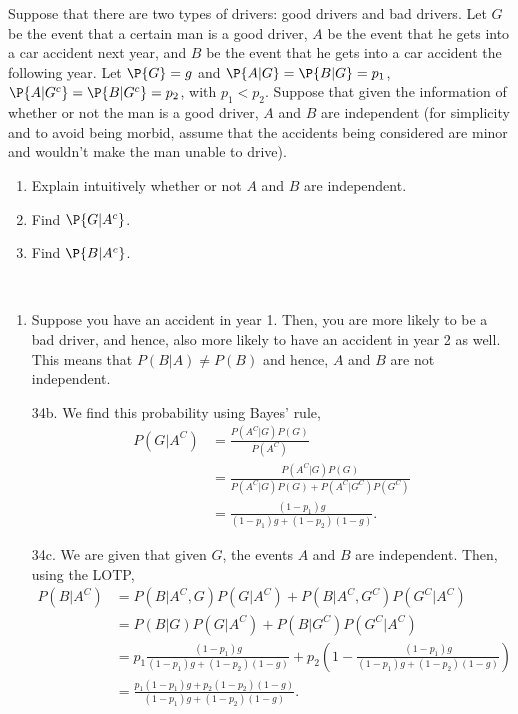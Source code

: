 

\setcounter{theorem}{15}

\begin{exercise} [BH.2.16] 
Suppose that there are two types of drivers: good drivers and bad drivers. Let $G$ be the event that a certain man is a good driver, $A$ be the event that he gets into a car accident next year, and $B$ be the event that he gets into a car accident the following year. Let $\P{G} = g$ and $\P{A|G} = \P{B|G} = p_1$, $\P{A|G^c} = \P{B|G^c} = p_2$, with $p_1 < p_2$. Suppose that given the information of whether or not the man is a good driver, $A$ and $B$ are independent (for simplicity and to avoid being morbid, assume that the accidents being considered are minor and wouldn’t make the man unable to drive).
	\begin{enumerate}
		\item Explain intuitively whether or not $A$ and $B$ are independent.
		\item Find $\P{G|A^c}$.
		\item Find $\P{B|A^c}$.
	\end{enumerate}
\begin{solution}~
	\begin{enumerate}
		\item Suppose you have an accident in year 1. Then, you are more likely to be a bad driver, and hence, also more likely to have an accident in year 2 as well. This means that $P(B|A)\neq P(B)$ and hence, $A$ and $B$ are not independent.
		\item[34b.] We find this probability using Bayes' rule,
		\begin{align*}
			P(G|A^{C})& =\frac{P(A^{C}|G)P(G)}{P(A^{C})}\\ &=\frac{P(A^{C}|G)P(G)}{P(A^{C}|G)P(G) + P(A^{C}|G^C)P(G^C)}\\
			&= \frac{(1-p_{1})g}{(1-p_{1})g + (1-p_{2})(1-g)}.
		\end{align*}
		\item[34c.] We are given that given $G$, the events $A$ and $B$ are independent. Then, using the LOTP,
 		\begin{align*}
			P(B|A^{C})& = P(B|A^{C},G)P(G|A^{C}) + P(B|A^{C},G^{C})P(G^{C}|A^{C})\\
			&=P(B|G)P(G|A^{C}) + P(B|G^{C})P(G^{C}|A^{C})\\
			&=p_{1}\frac{(1-p_{1})g}{(1-p_{1})g + (1-p_{2})(1-g)} + p_{2}\left(1-\frac{(1-p_{1})g}{(1-p_{1})g + (1-p_{2})(1-g)}\right)\\
			&=\frac{p_{1}(1-p_{1})g + p_{2}(1-p_{2})(1-g)}{(1-p_{1})g + (1-p_{2})(1-g)}.
		\end{align*}
	\end{enumerate}
\end{solution}
\end{exercise}



